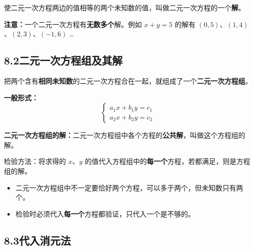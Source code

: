 \documentclass[12pt, a4paper]{ctexart}
\begin{document}
\begin{knowledgebox}[二元一次方程的解]
使二元一次方程两边的值相等的两个未知数的值，叫做二元一次方程的一个\textbf{解}。

\medskip
\textbf{注意：}一个二元一次方程有\textbf{无数多个}解。例如 $x + y = 5$ 的解有 $(0, 5)$、$(1, 4)$、$(2, 3)$、$(-1, 6)$ \ldots
\end{knowledgebox}

\subsection*{8.2\quad 二元一次方程组及其解}

\begin{knowledgebox}[二元一次方程组]
把两个含有\textbf{相同未知数}的二元一次方程合在一起，就组成了一个\textbf{二元一次方程组}。

\medskip
\textbf{一般形式：}
$$\begin{cases} a_1 x + b_1 y = c_1 \\ a_2 x + b_2 y = c_2 \end{cases}$$

\medskip
\textbf{二元一次方程组的解：}二元一次方程组中各个方程的\textbf{公共解}，叫做这个方程组的解。

\medskip
检验方法：将求得的 $x$、$y$ 的值代入方程组中的\textbf{每一个}方程，若都满足，则是方程组的解。
\end{knowledgebox}

\begin{warnbox}[易错提醒]
\begin{itemize}[leftmargin=1.5em]
  \item 二元一次方程组中不一定要恰好两个方程，可以多于两个，但未知数只有两个。
  \item 检验时必须代入\textbf{每一个}方程都验证，只代入一个是不够的。
\end{itemize}
\end{warnbox}

\subsection*{8.3\quad 代入消元法}
\end{document}
